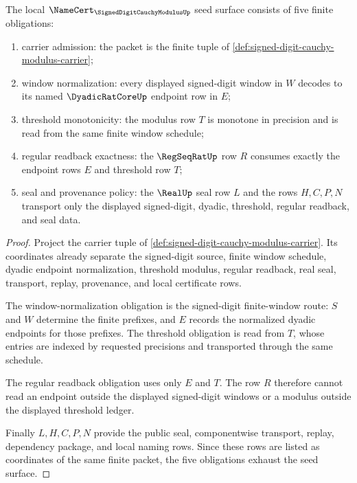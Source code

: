 \begin{theorem}
\label{thm:signed-digit-cauchy-modulus-namecert-obligations}
The local $\NameCert_{\SignedDigitCauchyModulusUp}$ seed surface consists of five finite obligations:
\begin{enumerate}
\item carrier admission: the packet is the finite tuple of \autoref{def:signed-digit-cauchy-modulus-carrier};
\item window normalization: every displayed signed-digit window in $W$ decodes to its named $\DyadicRatCoreUp$ endpoint row in $E$;
\item threshold monotonicity: the modulus row $T$ is monotone in precision and is read from the same finite window schedule;
\item regular readback exactness: the $\RegSeqRatUp$ row $R$ consumes exactly the endpoint rows $E$ and threshold row $T$;
\item seal and provenance policy: the $\RealUp$ seal row $L$ and the rows $H,C,P,N$ transport only the displayed signed-digit, dyadic, threshold, regular readback, and seal data.
\end{enumerate}
\end{theorem}
\begin{proof}
Project the carrier tuple of \autoref{def:signed-digit-cauchy-modulus-carrier}. Its coordinates already separate the signed-digit source, finite window schedule, dyadic endpoint normalization, threshold modulus, regular readback, real seal, transport, replay, provenance, and local certificate rows.

The window-normalization obligation is the signed-digit finite-window route: $S$ and $W$ determine the finite prefixes, and $E$ records the normalized dyadic endpoints for those prefixes. The threshold obligation is read from $T$, whose entries are indexed by requested precisions and transported through the same schedule.

The regular readback obligation uses only $E$ and $T$. The row $R$ therefore cannot read an endpoint outside the displayed signed-digit windows or a modulus outside the displayed threshold ledger.

Finally $L,H,C,P,N$ provide the public seal, componentwise transport, replay, dependency package, and local naming rows. Since these rows are listed as coordinates of the same finite packet, the five obligations exhaust the seed surface.
\end{proof}

